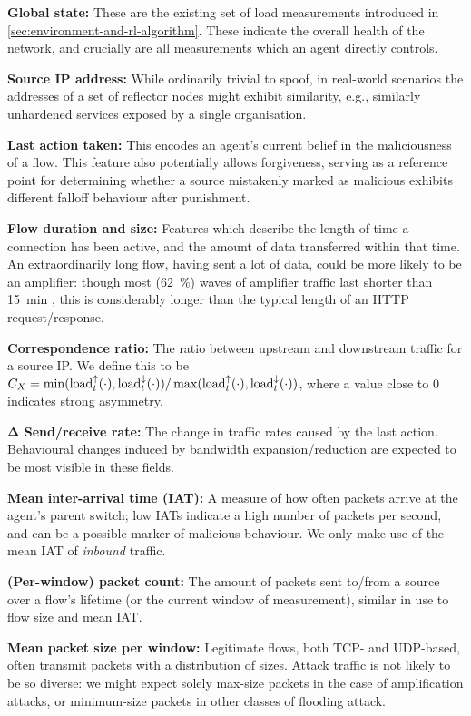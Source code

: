 \documentclass[conference, letterpaper, 10pt, times]{IEEEtran}
\newcommand{\fakepara}[1]{\noindent\textbf{#1:}}
\begin{document}
\fakepara{Global state}
These are the existing set of load measurements introduced in \cref{sec:environment-and-rl-algorithm}.
These indicate the overall health of the network, and crucially are all measurements which an agent directly controls.

\fakepara{Source IP address}
While ordinarily trivial to spoof, in real-world scenarios the addresses of a set of reflector nodes might exhibit similarity, e.g., similarly unhardened services exposed by a single organisation.

\fakepara{Last action taken}
This encodes an agent's current belief in the maliciousness of a flow.
This feature also potentially allows forgiveness, serving as a reference point for determining whether a source mistakenly marked as malicious exhibits different falloff behaviour after punishment.

\fakepara{Flow duration and size}
Features which describe the length of time a connection has been active, and the amount of data transferred within that time.
An extraordinarily long flow, having sent a lot of data, could be more likely to be an amplifier: though most (\SI{62}{\percent}) waves of amplifier traffic last shorter than \SI{15}{\minute} \cite{DBLP:conf/raid/KramerKMNKYR15}, this is considerably longer than the typical length of an HTTP request/response.

\fakepara{Correspondence ratio}
The ratio between upstream and downstream traffic for a source IP.
We define this to be $C_X = \min(\operatorname{load}^{\uparrow}_{t}(\cdot), \operatorname{load}^{\downarrow}_{t}(\cdot))/\max(\operatorname{load}^{\uparrow}_{t}(\cdot), \operatorname{load}^{\downarrow}_{t}(\cdot))$, where a value close to 0 indicates strong asymmetry.

\fakepara{$\mathbf{\Delta}$ Send/receive rate}
The change in traffic rates caused by the last action.
Behavioural changes induced by bandwidth expansion/reduction are expected to be most visible in these fields.

\fakepara{Mean inter-arrival time (IAT)}
A measure of how often packets arrive at the agent's parent switch; low IATs indicate a high number of packets per second, and can be a possible marker of malicious behaviour.
We only make use of the mean IAT of \emph{inbound} traffic.

\fakepara{(Per-window) packet count}
The amount of packets sent to/from a source over a flow's lifetime (or the current window of measurement), similar in use to flow size and mean IAT.

\fakepara{Mean packet size per window}
Legitimate flows, both TCP- and UDP-based, often transmit packets with a distribution of sizes.
Attack traffic is not likely to be so diverse: we might expect solely max-size packets in the case of amplification attacks, or minimum-size packets in other classes of flooding attack.
\end{document}
